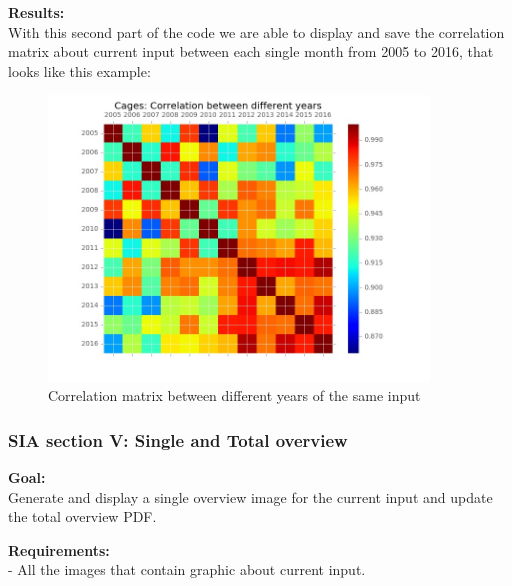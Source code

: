 \begin{minipage}{0.5\textwidth}
\textbf{Results:} \\
With this second part of the code we are able to display and save the correlation matrix about current input between each single month from 2005 to 2016, that looks like this example:
\end{minipage} \hfill
\begin{minipage}{0.45\textwidth}
\begin{figure}[H]
    \includegraphics[width=0.9\textwidth]{Files/Cages_Years_Matrix.jpg}
    \caption{Correlation matrix between different years of the same input}
\end{figure}
\end{minipage}

\newpage
\subsubsection{SIA section V: Single and Total overview}

\textbf{Goal:}\\
Generate and display a single overview image for the current input and update the total overview PDF.

\textbf{Requirements:}\\
- All the images that contain graphic about current input.

